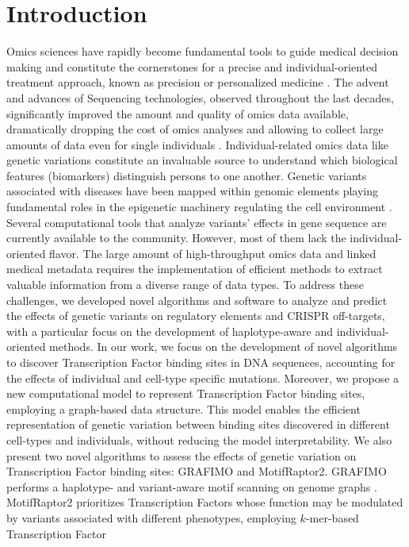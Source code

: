\documentclass[a4paper, titlepage, openright]{book}
\newcommand{\mychapter}[2]{
    \setcounter{chapter}{#1}
    \setcounter{section}{0}
    \chapter*{#2}
    \addcontentsline{toc}{chapter}{#2}
}
\begin{document}
\begin{frontespizio}
\end{frontespizio}
\tableofcontents
\listoffigures
\listoftables
\mychapter{1}{Introduction}
Omics sciences have rapidly become fundamental tools to guide medical decision making and constitute the cornerstones for a precise and individual-oriented treatment approach, known as precision or personalized medicine \citep{ginsburg2009genomic}. The advent and advances of Sequencing technologies, observed throughout the last decades, significantly improved the amount and quality of omics data available, dramatically dropping the cost of omics analyses and allowing to collect large amounts of data even for single individuals \citep{voelkerding2009next}. Individual-related omics data like genetic variations constitute an invaluable source to understand which biological features (biomarkers) distinguish persons to one another. Genetic variants associated with diseases have been mapped within genomic elements playing fundamental roles in the epigenetic machinery regulating the cell environment \citep{maurano2012systematic}. Several computational tools that analyze variants' effects in gene sequence are currently available to the community. However, most of them lack the individual-oriented flavor. The large amount of high-throughput omics data and linked medical metadata requires the implementation of efficient methods to extract valuable information from a diverse range of data types. To address these challenges, we developed novel algorithms and software to analyze and predict the effects of genetic variants on regulatory elements and CRISPR off-targets, with a particular focus on the development of haplotype-aware and individual-oriented methods. In our work, we focus on the development of novel algorithms to discover Transcription Factor binding sites in DNA sequences, accounting for the effects of individual and cell-type specific mutations. Moreover, we propose a new computational model to represent Transcription Factor binding sites, employing a graph-based data structure. This model enables the efficient representation of genetic variation between binding sites discovered in different cell-types and individuals, without reducing the model interpretability. We also present two novel algorithms to assess the effects of genetic variation on Transcription Factor binding sites: GRAFIMO \citep{tognon2021grafimo} and MotifRaptor2. GRAFIMO performs a haplotype- and variant-aware motif scanning on genome graphs \citep{paten2017genome}. MotifRaptor2 prioritizes Transcription Factors whose function may be modulated by variants associated with different phenotypes, employing $k$-mer-based Transcription Factor 
\end{document}
